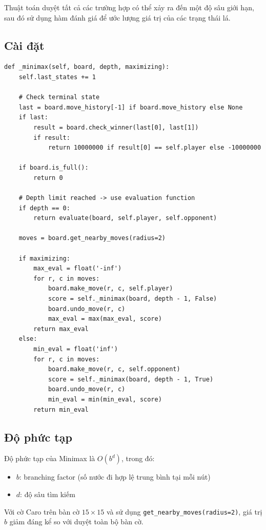 \documentclass[12pt,a4paper]{article}
\begin{document}
Thuật toán duyệt tất cả các trường hợp có thể xảy ra đến một độ sâu giới hạn, sau đó sử dụng hàm đánh giá để ước lượng giá trị của các trạng thái lá.

\subsection{Cài đặt}

\begin{lstlisting}[style=python]
def _minimax(self, board, depth, maximizing):
    self.last_states += 1
    
    # Check terminal state
    last = board.move_history[-1] if board.move_history else None
    if last:
        result = board.check_winner(last[0], last[1])
        if result:
            return 10000000 if result[0] == self.player else -10000000
    
    if board.is_full():
        return 0
    
    # Depth limit reached -> use evaluation function
    if depth == 0:
        return evaluate(board, self.player, self.opponent)
    
    moves = board.get_nearby_moves(radius=2)
    
    if maximizing:
        max_eval = float('-inf')
        for r, c in moves:
            board.make_move(r, c, self.player)
            score = self._minimax(board, depth - 1, False)
            board.undo_move(r, c)
            max_eval = max(max_eval, score)
        return max_eval
    else:
        min_eval = float('inf')
        for r, c in moves:
            board.make_move(r, c, self.opponent)
            score = self._minimax(board, depth - 1, True)
            board.undo_move(r, c)
            min_eval = min(min_eval, score)
        return min_eval
\end{lstlisting}

\subsection{Độ phức tạp}

Độ phức tạp của Minimax là $O(b^d)$, trong đó:
\begin{itemize}
    \item $b$: branching factor (số nước đi hợp lệ trung bình tại mỗi nút)
    \item $d$: độ sâu tìm kiếm
\end{itemize}

Với cờ Caro trên bàn cờ $15 \times 15$ và sử dụng \texttt{get\_nearby\_moves(radius=2)}, giá trị $b$ giảm đáng kể so với duyệt toàn bộ bàn cờ.
\end{document}
